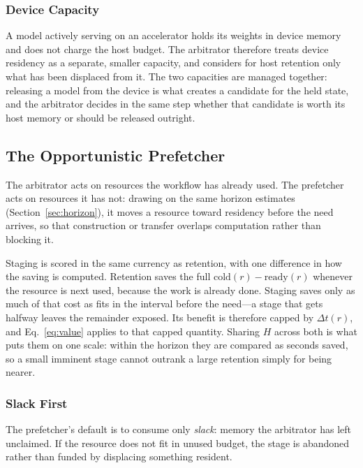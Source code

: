 \subsubsection{Device Capacity}

A model actively serving on an accelerator holds its weights in device memory
and does not charge the host budget. The arbitrator therefore treats device
residency as a separate, smaller capacity, and considers for host retention
only what has been displaced from it. The two capacities are managed together:
releasing a model from the device is what creates a candidate for the held
state, and the arbitrator decides in the same step whether that candidate is
worth its host memory or should be released outright.

\subsection{The Opportunistic Prefetcher}
\label{sec:prefetch}

The arbitrator acts on resources the workflow has already used. The prefetcher
acts on resources it has not: drawing on the same horizon estimates
(Section~\ref{sec:horizon}), it moves a resource toward residency before the
need arrives, so that construction or transfer overlaps computation rather
than blocking it.

Staging is scored in the same currency as retention, with one difference in
how the saving is computed. Retention saves the full $\mathrm{cold}(r) -
\mathrm{ready}(r)$ whenever the resource is next used, because the work is
already done. Staging saves only as much of that cost as fits in the interval
before the need---a stage that gets halfway leaves the remainder exposed. Its
benefit is therefore capped by $\Delta t(r)$, and Eq.~\ref{eq:value} applies
to that capped quantity. Sharing $H$ across both is what puts them on one
scale: within the horizon they are compared as seconds saved, so a small
imminent stage cannot outrank a large retention simply for being nearer.

\subsubsection{Slack First}

The prefetcher's default is to consume only \emph{slack}: memory the
arbitrator has left unclaimed. If the resource does not fit in unused budget,
the stage is abandoned rather than funded by displacing something resident.

